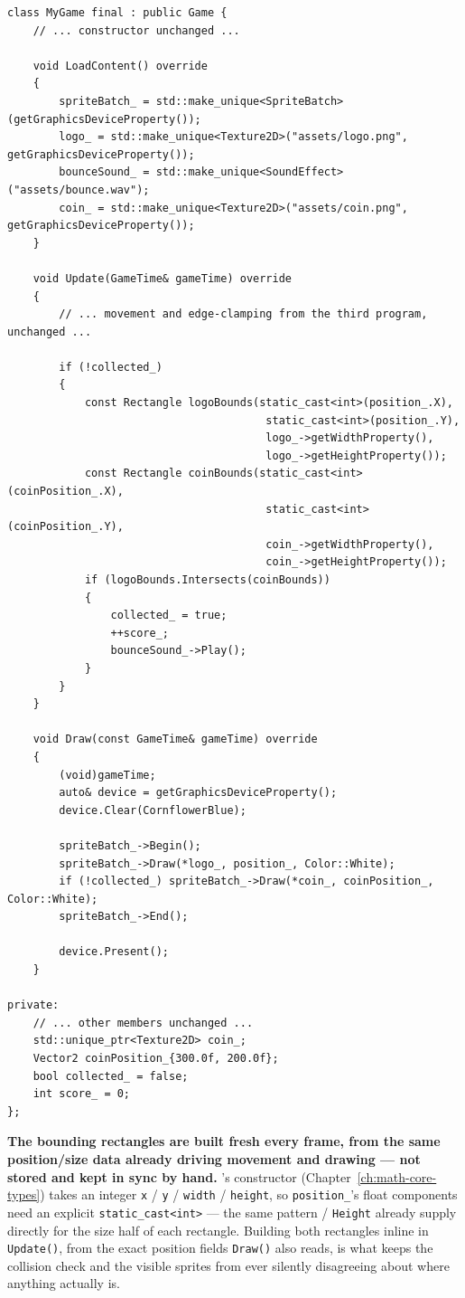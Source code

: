 \begin{lstlisting}
class MyGame final : public Game {
    // ... constructor unchanged ...

    void LoadContent() override
    {
        spriteBatch_ = std::make_unique<SpriteBatch>(getGraphicsDeviceProperty());
        logo_ = std::make_unique<Texture2D>("assets/logo.png", getGraphicsDeviceProperty());
        bounceSound_ = std::make_unique<SoundEffect>("assets/bounce.wav");
        coin_ = std::make_unique<Texture2D>("assets/coin.png", getGraphicsDeviceProperty());
    }

    void Update(GameTime& gameTime) override
    {
        // ... movement and edge-clamping from the third program, unchanged ...

        if (!collected_)
        {
            const Rectangle logoBounds(static_cast<int>(position_.X),
                                        static_cast<int>(position_.Y),
                                        logo_->getWidthProperty(),
                                        logo_->getHeightProperty());
            const Rectangle coinBounds(static_cast<int>(coinPosition_.X),
                                        static_cast<int>(coinPosition_.Y),
                                        coin_->getWidthProperty(),
                                        coin_->getHeightProperty());
            if (logoBounds.Intersects(coinBounds))
            {
                collected_ = true;
                ++score_;
                bounceSound_->Play();
            }
        }
    }

    void Draw(const GameTime& gameTime) override
    {
        (void)gameTime;
        auto& device = getGraphicsDeviceProperty();
        device.Clear(CornflowerBlue);

        spriteBatch_->Begin();
        spriteBatch_->Draw(*logo_, position_, Color::White);
        if (!collected_) spriteBatch_->Draw(*coin_, coinPosition_, Color::White);
        spriteBatch_->End();

        device.Present();
    }

private:
    // ... other members unchanged ...
    std::unique_ptr<Texture2D> coin_;
    Vector2 coinPosition_{300.0f, 200.0f};
    bool collected_ = false;
    int score_ = 0;
};
\end{lstlisting}

\textbf{The bounding rectangles are built fresh every frame, from the same position/size data
already driving movement and drawing --- not stored and kept in sync by hand.}
's constructor (Chapter~\ref{ch:math-core-types}) takes an integer
\texttt{x} / \texttt{y} / \texttt{width} / \texttt{height}, so \texttt{position\_}'s float
components need an explicit \texttt{static\_cast<int>} --- the same pattern
 / \texttt{Height} already supply directly for the size half of each
rectangle. Building both rectangles inline in \texttt{Update()}, from the exact position
fields \texttt{Draw()} also reads, is what keeps the collision check and the visible sprites
from ever silently disagreeing about where anything actually is.

